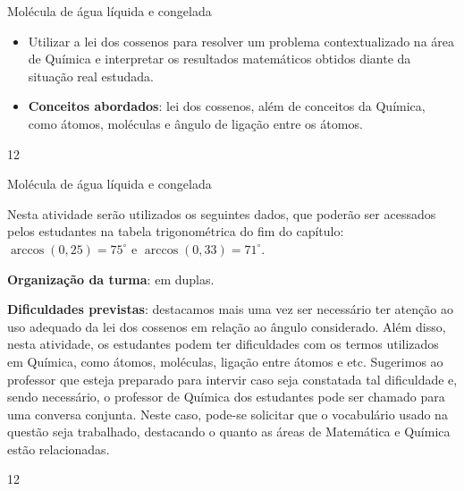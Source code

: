 \clearmargin
\begin{objectives}{Molécula de água líquida e congelada}
{
\begin{itemize}
\item Utilizar a lei dos cossenos para resolver um problema contextualizado na área de Química e interpretar os resultados matemáticos obtidos diante da situação real estudada.

\item \textbf{Conceitos abordados}: lei dos cossenos, além de conceitos da Química, como átomos, moléculas e ângulo de ligação entre os átomos.
\end{itemize}
}{1}{2}
\end{objectives}
\begin{sugestions}{Molécula de água líquida e congelada}
{
Nesta atividade serão utilizados os seguintes dados, que poderão ser acessados pelos estudantes na tabela trigonométrica do fim do capítulo: $\arccos({0,25})=75^\circ$ e $\arccos({0,33})=71^\circ$. 

\textbf{Organização da turma}: em duplas.

\textbf{Dificuldades previstas}: destacamos mais uma vez ser necessário ter atenção ao uso adequado da lei dos cossenos em relação ao ângulo considerado. Além disso, nesta atividade, os estudantes podem ter dificuldades com os termos utilizados em Química, como átomos, moléculas, ligação entre átomos e etc. Sugerimos ao professor que esteja preparado para intervir caso seja constatada tal dificuldade e, sendo necessário, o professor de Química dos estudantes pode ser chamado para uma conversa conjunta. Neste caso, pode-se solicitar que o vocabulário usado na questão seja trabalhado, destacando o quanto as áreas de Matemática e Química estão relacionadas.
}{1}{2}
\end{sugestions}
